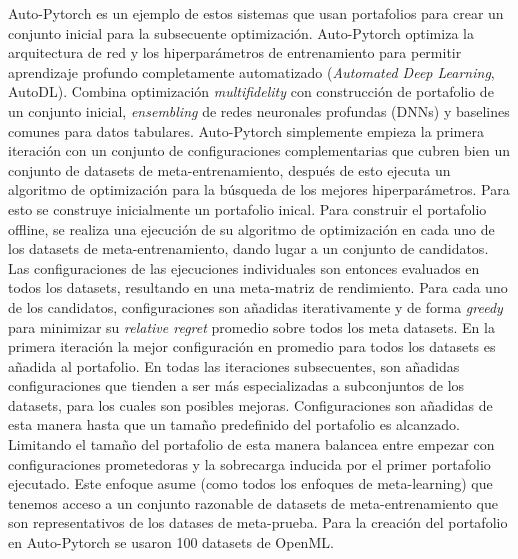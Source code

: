 Auto-Pytorch es un ejemplo de estos sistemas que usan portafolios para crear un conjunto inicial para la subsecuente optimización. Auto-Pytorch optimiza la arquitectura de red y los hiperparámetros de entrenamiento para permitir aprendizaje profundo completamente automatizado (\textit{Automated Deep Learning}, AutoDL). Combina optimización \textit{multifidelity} con construcción de portafolio de un conjunto inicial, \textit{ensembling} de redes neuronales profundas (DNNs) y baselines comunes para datos tabulares. Auto-Pytorch simplemente empieza la primera iteración con un conjunto de configuraciones complementarias que cubren bien un conjunto de datasets de meta-entrenamiento, después de esto ejecuta un algoritmo de optimización para la búsqueda de los mejores hiperparámetros. Para esto se construye inicialmente un portafolio inical. Para construir el portafolio offline, se realiza una ejecución de su algoritmo de optimización en cada uno de los datasets de meta-entrenamiento, dando lugar a un conjunto de candidatos. Las configuraciones de las ejecuciones individuales son entonces evaluados en todos los datasets, resultando en una meta-matriz de rendimiento. Para cada uno de los candidatos, configuraciones son añadidas iterativamente y de forma \textit{greedy} para minimizar su \textit{relative regret} promedio sobre todos los meta datasets. En la primera iteración la mejor configuración en promedio para todos los datasets es añadida al portafolio. En todas las iteraciones subsecuentes, son añadidas configuraciones que tienden a ser más especializadas a subconjuntos de los datasets, para los cuales son posibles mejoras. Configuraciones son añadidas de esta manera hasta que un tamaño predefinido del portafolio es alcanzado. Limitando el tamaño del portafolio de esta manera balancea entre empezar con configuraciones prometedoras y la sobrecarga inducida por el primer portafolio ejecutado. Este enfoque asume (como todos los enfoques de meta-learning) que tenemos acceso a un conjunto razonable de datasets de meta-entrenamiento que son representativos de los datases de meta-prueba. Para la creación del portafolio en Auto-Pytorch se usaron 100 datasets de OpenML.


